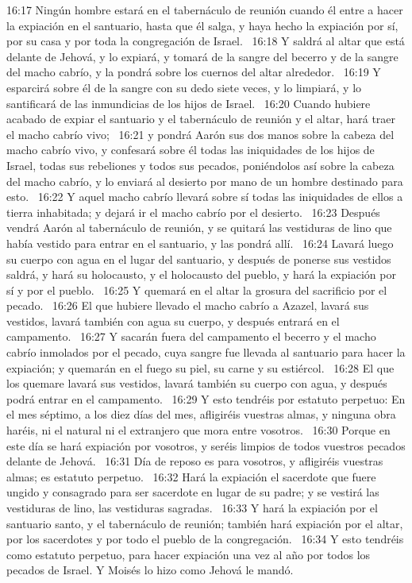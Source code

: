 16:17 Ningún hombre estará en el tabernáculo de reunión cuando él entre a hacer la expiación en el santuario, hasta que él salga, y haya hecho la expiación por sí, por su casa y por toda la congregación de Israel.  
16:18 Y saldrá al altar que está delante de Jehová, y lo expiará, y tomará de la sangre del becerro y de la sangre del macho cabrío, y la pondrá sobre los cuernos del altar alrededor.  
16:19 Y esparcirá sobre él de la sangre con su dedo siete veces, y lo limpiará, y lo santificará de las inmundicias de los hijos de Israel.  
16:20 Cuando hubiere acabado de expiar el santuario y el tabernáculo de reunión y el altar, hará traer el macho cabrío vivo;  
16:21 y pondrá Aarón sus dos manos sobre la cabeza del macho cabrío vivo, y confesará sobre él todas las iniquidades de los hijos de Israel, todas sus rebeliones y todos sus pecados, poniéndolos así sobre la cabeza del macho cabrío, y lo enviará al desierto por mano de un hombre destinado para esto.  
16:22 Y aquel macho cabrío llevará sobre sí todas las iniquidades de ellos a tierra inhabitada; y dejará ir el macho cabrío por el desierto.  
16:23 Después vendrá Aarón al tabernáculo de reunión, y se quitará las vestiduras de lino que había vestido para entrar en el santuario, y las pondrá allí.  
16:24 Lavará luego su cuerpo con agua en el lugar del santuario, y después de ponerse sus vestidos saldrá, y hará su holocausto, y el holocausto del pueblo, y hará la expiación por sí y por el pueblo.  
16:25 Y quemará en el altar la grosura del sacrificio por el pecado.  
16:26 El que hubiere llevado el macho cabrío a Azazel, lavará sus vestidos, lavará también con agua su cuerpo, y después entrará en el campamento.  
16:27 Y sacarán fuera del campamento el becerro y el macho cabrío inmolados por el pecado, cuya sangre fue llevada al santuario para hacer la expiación; y quemarán en el fuego su piel, su carne y su estiércol.  
16:28 El que los quemare lavará sus vestidos, lavará también su cuerpo con agua, y después podrá entrar en el campamento.  
16:29 Y esto tendréis por estatuto perpetuo: En el mes séptimo, a los diez días del mes, afligiréis vuestras almas, y ninguna obra haréis, ni el natural ni el extranjero que mora entre vosotros.  
16:30 Porque en este día se hará expiación por vosotros, y seréis limpios de todos vuestros pecados delante de Jehová.  
16:31 Día de reposo es para vosotros, y afligiréis vuestras almas; es estatuto perpetuo.  
16:32 Hará la expiación el sacerdote que fuere ungido y consagrado para ser sacerdote en lugar de su padre; y se vestirá las vestiduras de lino, las vestiduras sagradas.  
16:33 Y hará la expiación por el santuario santo, y el tabernáculo de reunión; también hará expiación por el altar, por los sacerdotes y por todo el pueblo de la congregación.  
16:34 Y esto tendréis como estatuto perpetuo, para hacer expiación una vez al año por todos los pecados de Israel. Y Moisés lo hizo como Jehová le mandó.  
